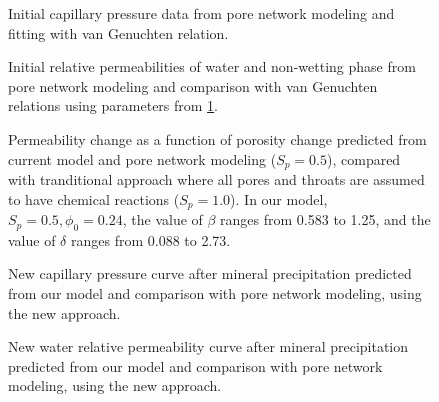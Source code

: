 \documentclass[preprint,12pt,authoryear]{elsarticle}
\begin{document}
\begin{figure} 
\centering \setlength\figureheight{6cm} \setlength\figurewidth{6cm}  \caption{Initial capillary pressure data from pore network modeling and fitting with van Genuchten relation.} \label{fig:vanPc} 
\end{figure}

\begin{figure} 
\centering \setlength\figureheight{6cm} \setlength\figurewidth{6cm}  \caption{Initial relative permeabilities of water and non-wetting phase from pore network modeling and comparison with van Genuchten relations using parameters from \ref{fig:vanPc}.} \label{fig:vanKr} 
\end{figure}

%
\begin{figure} 
\centering  \setlength\figureheight{6cm} \setlength\figurewidth{6cm}  \caption{Permeability change as a function of porosity change predicted from current model and pore network modeling ($S_p=0.5$), compared with tranditional approach where all pores and throats are assumed to have chemical reactions ($S_p=1.0$). In our model, $S_p=0.5, \phi_0=0.24$, the value of $\beta$ ranges from 0.583 to 1.25, and the value of $\delta$ ranges from 0.088 to 2.73.} \label{fig:PermPoro} 
\end{figure}
%

\begin{figure} 
\centering \setlength\figureheight{6cm} \setlength\figurewidth{6cm}  \caption{New capillary pressure curve after mineral precipitation predicted from our model and comparison with pore network modeling, using the new approach.} \label{fig:PcPcp} 
\end{figure}

\begin{figure} 
\centering \setlength\figureheight{6cm} \setlength\figurewidth{6cm}  \caption{New water relative permeability curve after mineral precipitation predicted from our model and comparison with pore network modeling, using the new approach.} \label{fig:KrwPcp} 
\end{figure}
\end{document}

